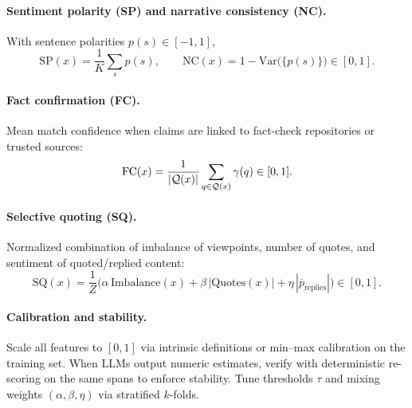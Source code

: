 \documentclass[ai,article,submit,pdftex,moreauthors]{Definitions/mdpi}
\begin{document}
\paragraph{Sentiment polarity (SP) and narrative consistency (NC).} With sentence polarities $p(s)\in[-1,1]$,
\begin{equation}
\mathrm{SP}(x)=\frac{1}{K}\sum_{s}p(s),\qquad \mathrm{NC}(x)=1-\mathrm{Var}\!\big(\{p(s)\}\big)\in[0,1].
\end{equation}

\paragraph{Fact confirmation (FC).} Mean match confidence when claims are linked to fact-check repositories or trusted sources:
\begin{equation}
\mathrm{FC}(x)=\frac{1}{|{\cal Q}(x)|}\sum_{q\in{\cal Q}(x)}\gamma(q)\in[0,1].
\end{equation}

\paragraph{Selective quoting (SQ).} Normalized combination of imbalance of viewpoints, number of quotes, and sentiment of quoted/replied content:
\begin{equation}
\mathrm{SQ}(x)=\frac{1}{Z}\big(\alpha\,\mathrm{Imbalance}(x)+\beta\,|\mathrm{Quotes}(x)|+\eta\,|\overline{p}_{\text{replies}}|\big)\in[0,1].
\end{equation}

\paragraph{Calibration and stability.}
Scale all features to $[0,1]$ via intrinsic definitions or min--max calibration on the training set. When LLMs output numeric estimates, verify with deterministic re-scoring on the same spans to enforce stability. Tune thresholds $\tau$ and mixing weights $(\alpha,\beta,\eta)$ via stratified $k$-folds.
\end{document}
